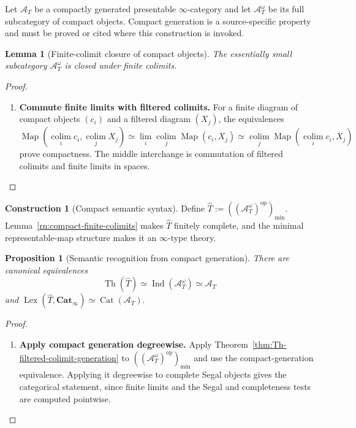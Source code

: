 \documentclass[oneside]{article}
\theoremstyle{plain}
\newtheorem{lemma}[theorem]{Lemma}
\newtheorem{proposition}[theorem]{Proposition}
\theoremstyle{definition}
\newtheorem{construction}[theorem]{Construction}
\theoremstyle{remark}
\newcommand{\Cat}{\mathbf{Cat}_{\infty}}
\newcommand{\Ind}{\operatorname{Ind}}
\newcommand{\Lex}{\operatorname{Lex}}
\newcommand{\Map}{\operatorname{Map}}
\newcommand{\Th}{\operatorname{Th}}
\newcommand{\colim}{\operatorname*{colim}}
\newcommand{\minrep}{\mathrm{min}}
\newcommand{\op}{\mathrm{op}}
\begin{document}
Let \(\mathcal A_T\) be a compactly generated presentable \(\infty\)-category
and let \(\mathcal A_T^\omega\) be its full subcategory of compact objects.
Compact generation is a source-specific property and must be proved or cited
where this construction is invoked.

\begin{lemma}[Finite-colimit closure of compact objects]\label{old:c8s7:lemma1}
\label{rn:compact-finite-colimits}
The essentially small subcategory \(\mathcal A_T^\omega\) is closed under
finite colimits.
\end{lemma}

\begin{proof}
\leavevmode
\begin{enumerate}
\item \textbf{Commute finite limits with filtered colimits.} For a finite diagram of compact objects $(c_i)$ and a filtered diagram
$(X_j)$, the equivalences
\[
 \Map(\colim_i c_i,\colim_jX_j)
 \simeq\lim_i\colim_j\Map(c_i,X_j)
 \simeq\colim_j\Map(\colim_i c_i,X_j)
\]
prove compactness. The middle interchange is commutation of filtered
colimits and finite limits in spaces.\qedhere
\end{enumerate}
\end{proof}

\begin{construction}[Compact semantic syntax]\label{old:c8s7:construction1}
\label{rn:compact-syntax}
Define $\widehat T:=((\mathcal A_T^\omega)^{\op})_{\minrep}.$ Lemma~\ref{rn:compact-finite-colimits} makes \(\widehat T\) finitely complete,
and the minimal representable-map structure makes it an \(\infty\)-type theory.
\end{construction}

\begin{proposition}[Semantic recognition from compact generation]\label{old:c8s7:proposition1}
\label{rn:semantic-recognition}
There are canonical equivalences
\[
 \Th(\widehat T)
 \simeq
 \Ind(\mathcal A_T^\omega)
 \simeq
 \mathcal A_T
\]
and $\Lex(\widehat T,\Cat) \simeq \operatorname{Cat}(\mathcal A_T).$ \end{proposition}

\begin{proof}
\leavevmode
\begin{enumerate}
\item \textbf{Apply compact generation degreewise.} Apply Theorem~\ref{thm:Th-filtered-colimit-generation} to
\(((\mathcal A_T^\omega)^{\op})_{\minrep}\) and use the compact-generation
equivalence. Applying it degreewise to complete Segal objects gives the categorical statement, since finite limits and the Segal and completeness tests are computed pointwise.\qedhere
\end{enumerate}
\end{proof}
\end{document}
